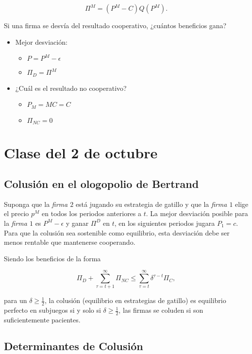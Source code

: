 \documentclass[letterpaper,12pt,twocolumn]{report}
\begin{document}
$$ \Pi^M = (P^M-C)Q(P^M).$$

Si una firma se desvía del resultado cooperativo, ¿cuántos beneficios gana?

\begin{itemize}
	\item Mejor desviación:
	\begin{itemize}
		\item $P=P^M-\epsilon$
		\item $\Pi_D= \Pi^M$
	\end{itemize}
	\item ¿Cuál es el resultado no cooperativo?
	\begin{itemize}
		\item $P_M=MC=C$
		\item $\Pi_{NC}=0$
	\end{itemize}
\end{itemize}


\section{Clase del 2 de octubre}

\subsection*{Colusión en el ologopolio de Bertrand}

Suponga que la \textit{firma $2$} está jugando su estrategia de gatillo y que la \textit{firma $1$} elige el precio $p^M$ en todos los periodos anteriores a $t$. La mejor desviación posible para la \textit{firma $1$} es $P^M-\epsilon$ y ganar $\Pi^D$ en $t$, en los siguientes periodos jugara $P_1=c$. Para que la colusión sea sostenible como equilibrio, esta desviación debe ser menos rentable que mantenerse cooperando.

Siendo los beneficios de la forma

$$ \Pi_D + \sum^{\infty}_{\tau =t+1}\Pi_{NC} \leq \sum^{\infty}_{\tau=t}\delta^{\tau-t}\Pi_C,$$

para un $\delta\geq \frac{1}{2}$, la colusión (equilibrio en estrategias de gatillo) es equilibrio perfecto en subjuegos si y solo si $\delta\geq \frac{1}{2}$, las firmas se coluden si son suficientemente pacientes.

\subsection*{Determinantes de Colusión}
\end{document}
